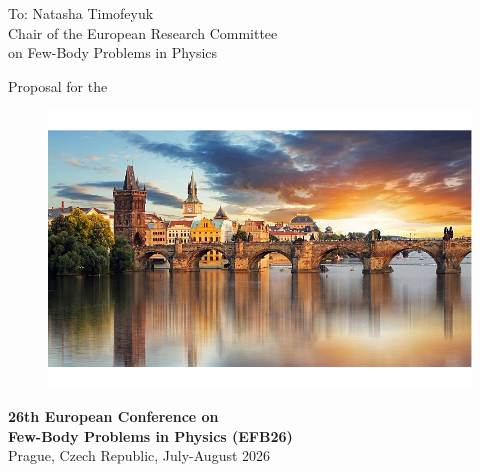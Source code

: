 \documentclass[12pt]{extarticle}
\begin{document}
\color{C0}


\noindent
To: Natasha Timofeyuk \\
Chair of the European Research Committee \\
on Few-Body Problems in Physics

\bigskip
\noindent
\doublespacing
{ \Large Proposal for the}

\begin{figure}[h]
  \centering
  \includegraphics[width=1.0\textwidth]{Prague_foto_cut.jpg}
\end{figure}
%

\vspace{-1cm}
\begin{center}
\noindent
\doublespacing
{\color{C2}\selectfont%
  \LARGE \bf  26th  European Conference on \\[2mm ] Few-Body Problems in Physics (EFB26)} \\[2mm]
{\Large Prague, Czech Republic, July-August 2026%
}
\end{center}

\vspace{1cm}

\onehalfspacing
\end{document}
